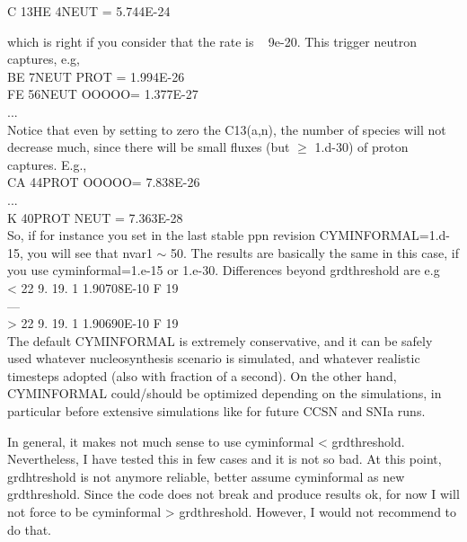  C  13HE  4NEUT = 5.744E-24

which is right if you consider that the rate is ~ 9e-20. This trigger neutron captures, e.g,\\

BE  7NEUT PROT = 1.994E-26\\
FE 56NEUT OOOOO= 1.377E-27\\
...\\

Notice that even by setting to zero the C13(a,n), the number of species will not decrease much, since there will be small fluxes (but $\geq$ 1.d-30) of proton captures. E.g.,\\

CA 44PROT OOOOO= 7.838E-26\\
...\\
K  40PROT NEUT = 7.363E-28\\

So, if for instance you set in the last stable ppn revision CYMINFORMAL=1.d-15, you will see that nvar1 $\sim$ 50.
The results are basically the same in this case, if you use cyminformal=1.e-15 or 1.e-30.
Differences beyond grdthreshold are e.g\\

<    22     9.  19.   1   1.90708E-10  F  19\\
---\\
>    22     9.  19.   1   1.90690E-10  F  19\\

The default CYMINFORMAL is extremely conservative, and it can be safely used whatever nucleosynthesis scenario is simulated, and whatever realistic timesteps adopted (also with fraction of a second).
On the other hand, CYMINFORMAL could/should be optimized depending on the simulations, in particular before extensive simulations like for future CCSN and SNIa runs. 

In general, it makes not much sense to use cyminformal < grdthreshold. 
Nevertheless, I have tested this in few cases and it is not so bad. 
At this point, grdhtreshold is not anymore reliable, better assume cyminformal as new grdthreshold.
Since the code does not break and produce results ok, for now I will not force to be cyminformal > grdthreshold.
However, I would not recommend to do that.






\vfill
